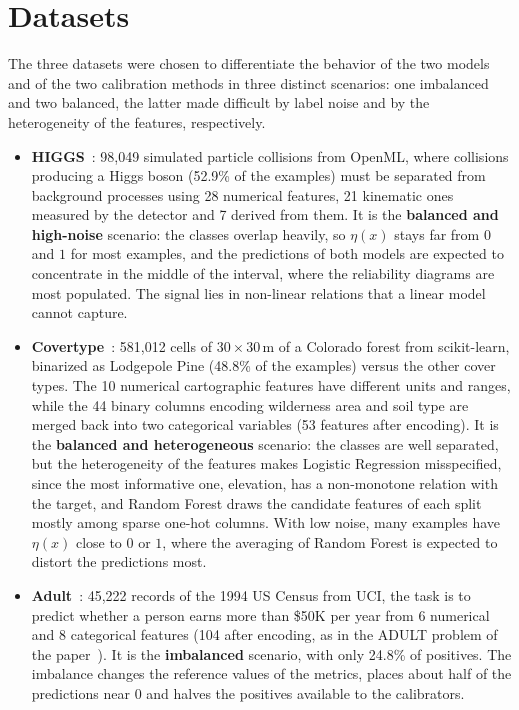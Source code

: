 \documentclass[a4paper, 10pt]{article}
\begin{document}
\section{Datasets}\label{sec:datasets}
The three datasets were chosen to differentiate the behavior of the two models and of the two calibration methods in three distinct scenarios: one imbalanced and two balanced, the latter made difficult by label noise and by the heterogeneity of the features, respectively.
\begin{itemize}
    \item \textbf{HIGGS}~\cite{baldi2014searching}: 98,049 simulated particle collisions from OpenML, where collisions producing a Higgs boson (52.9\% of the examples) must be separated from background processes using 28 numerical features, 21 kinematic ones measured by the detector and 7 derived from them. It is the \textbf{balanced and high-noise} scenario: the classes overlap heavily, so $\eta(x)$ stays far from $0$ and $1$ for most examples, and the predictions of both models are expected to concentrate in the middle of the interval, where the reliability diagrams are most populated. The signal lies in non-linear relations that a linear model cannot capture.
    \item \textbf{Covertype}~\cite{blackard1998covertype}: 581,012 cells of $30 \times 30$\,m of a Colorado forest from scikit-learn, binarized as Lodgepole Pine (48.8\% of the examples) versus the other cover types. The 10 numerical cartographic features have different units and ranges, while the 44 binary columns encoding wilderness area and soil type are merged back into two categorical variables (53 features after encoding). It is the \textbf{balanced and heterogeneous} scenario: the classes are well separated, but the heterogeneity of the features makes Logistic Regression misspecified, since the most informative one, elevation, has a non-monotone relation with the target, and Random Forest draws the candidate features of each split mostly among sparse one-hot columns. With low noise, many examples have $\eta(x)$ close to $0$ or $1$, where the averaging of Random Forest is expected to distort the predictions most.
    \item \textbf{Adult}~\cite{becker1996adult}: 45,222 records of the 1994 US Census from UCI, the task is to predict whether a person earns more than \$50K per year from 6 numerical and 8 categorical features (104 after encoding, as in the ADULT problem of the paper~\cite{niculescu2005predicting}). It is the \textbf{imbalanced} scenario, with only 24.8\% of positives. The imbalance changes the reference values of the metrics, places about half of the predictions near $0$ and halves the positives available to the calibrators.
\end{itemize}
\end{document}
